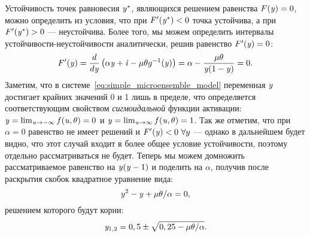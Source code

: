 Устойчивость точек равновесия $\mathit{y}^{*}$, являющихся решением равенства $F(\mathit{y}) = 0$, можно определить из условия, что при $F^{\prime}(\mathit{y}^{*}) < 0$ точка устойчива, а при $F^{\prime}(\mathit{y}^{*}) > 0$ --- неустойчива. Более того, мы можем определить интервалы устойчивости-неустойчивости аналитически, решив равенство $F^{\prime}(\mathit{y}) = 0$:
\begin{equation}
    \nonumber
    F^{\prime}(\mathit{y}) 
    = \dfrac{d}{d\mathit{y}}\left( \alpha \mathit{y} + \mathit{i} - \mu \theta g^{-1}(\mathit{y}) \right) 
    = \alpha - \dfrac{\mu \theta}{\mathit{y}(1 - \mathit{y})}
    = 0.
\end{equation}
Заметим, что в системе~\eqref{eq:simple_microensemble_model} переменная $\mathit{y}$ достигает крайних значений 0 и 1 лишь в пределе, что определяется соответствующим свойством \textit{сигмоидальной} функции активации: $\mathit{y} = \lim_{\mathit{u} \to -\infty} f(\mathit{u}, \theta) = 0$ и $\mathit{y} = \lim_{\mathit{u} \to \infty} f(\mathit{u}, \theta) = 1$. Так же отметим, что при $\alpha = 0$ равенство не имеет решений и $F^{\prime}(\mathit{y}) < 0\ \forall y$ --- однако в дальнейшем будет видно, что этот случай входит в более общее условие устойчивости, поэтому отдельно рассматриваться не будет. Теперь мы можем домножить рассматриваемое равенство на $\mathit{y}(\mathit{y} - 1)$ и поделить на $\alpha$, получив после раскрытия скобок квадратное уравнение вида:
\begin{equation}
    \nonumber
    \mathit{y}^{2} - \mathit{y} + \mu \theta / \alpha = 0,
\end{equation}
решением которого будут корни:
\begin{equation}
    \label{eq:sigm_stability_bounds_y}
    \mathit{y}_{1,2} = 0,5 \pm \sqrt{0,25 - \mu \theta / \alpha}.
\end{equation}

